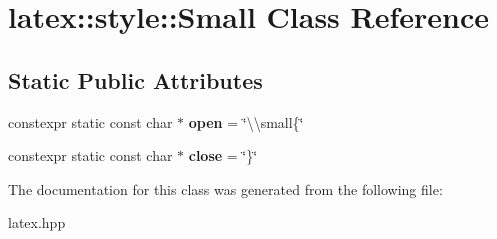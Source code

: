 \hypertarget{classlatex_1_1style_1_1Small}{\section{latex\-:\-:style\-:\-:Small Class Reference}
\label{classlatex_1_1style_1_1Small}
}
\subsection*{Static Public Attributes}
\begin{DoxyCompactItemize}
\item 
\hypertarget{classlatex_1_1style_1_1Small_aa4b5eb60283c5aca66119e49f5e1899a}{constexpr static const char $\ast$ {\bfseries open} = \char`\"{}\textbackslash{}\textbackslash{}small\{\char`\"{}}\label{classlatex_1_1style_1_1Small_aa4b5eb60283c5aca66119e49f5e1899a}

\item 
\hypertarget{classlatex_1_1style_1_1Small_a3e5d6979e01474f784f1072eadd0caca}{constexpr static const char $\ast$ {\bfseries close} = \char`\"{}\}\char`\"{}}\label{classlatex_1_1style_1_1Small_a3e5d6979e01474f784f1072eadd0caca}

\end{DoxyCompactItemize}


The documentation for this class was generated from the following file\-:\begin{DoxyCompactItemize}
\item 
latex.\-hpp\end{DoxyCompactItemize}
